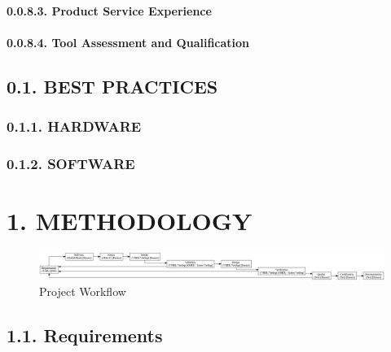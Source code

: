 \documentclass[
]{article}
\begin{document}
\hypertarget{product-service-experience}{%
\paragraph{0.0.8.3. Product Service
Experience}\label{product-service-experience}}

\hypertarget{tool-assessment-and-qualification}{%
\paragraph{0.0.8.4. Tool Assessment and
Qualification}\label{tool-assessment-and-qualification}}

\hypertarget{best-practices}{%
\subsection{0.1. BEST PRACTICES}\label{best-practices}}

\hypertarget{hardware}{%
\subsubsection{0.1.1. HARDWARE}\label{hardware}}

\hypertarget{software}{%
\subsubsection{0.1.2. SOFTWARE}\label{software}}

\hypertarget{methodology}{%
\section{1. METHODOLOGY}\label{methodology}}

\begin{figure}
\centering
\includegraphics{../doc/project.png}
\caption{Project Workflow}
\end{figure}

\hypertarget{requirements}{%
\subsection{1.1. Requirements}\label{requirements}}
\end{document}
